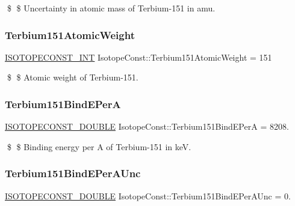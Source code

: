 \$ \$ Uncertainty in atomic mass of Terbium-\/151 in amu. \mbox{\label{group___isotope_const-_terbium-_tb151_ga727c99bcece1ee69cb6056fc2434ac6f}} 
\subsubsection{\texorpdfstring{Terbium151\+Atomic\+Weight}{Terbium151AtomicWeight}}
{\footnotesize\ttfamily \mbox{\hyperlink{group___isotope_const-_macros_ga5f18360b3e99483a35c32d789e62621c}{I\+S\+O\+T\+O\+P\+E\+C\+O\+N\+S\+T\+\_\+\+I\+NT}} Isotope\+Const\+::\+Terbium151\+Atomic\+Weight = 151}

\$ \$ Atomic weight of Terbium-\/151. \mbox{\label{group___isotope_const-_terbium-_tb151_ga8273639685e5c1fe7154f1833147f99f}} 
\subsubsection{\texorpdfstring{Terbium151\+Bind\+E\+PerA}{Terbium151BindEPerA}}
{\footnotesize\ttfamily \mbox{\hyperlink{group___isotope_const-_macros_ga8f45a7272ce02c0b4c65c44636ed719a}{I\+S\+O\+T\+O\+P\+E\+C\+O\+N\+S\+T\+\_\+\+D\+O\+U\+B\+LE}} Isotope\+Const\+::\+Terbium151\+Bind\+E\+PerA = 8208.}

\$ \$ Binding energy per A of Terbium-\/151 in keV. \mbox{\label{group___isotope_const-_terbium-_tb151_ga7e7e8564f1b29a7bf218d77202f49897}} 
\subsubsection{\texorpdfstring{Terbium151\+Bind\+E\+Per\+A\+Unc}{Terbium151BindEPerAUnc}}
{\footnotesize\ttfamily \mbox{\hyperlink{group___isotope_const-_macros_ga8f45a7272ce02c0b4c65c44636ed719a}{I\+S\+O\+T\+O\+P\+E\+C\+O\+N\+S\+T\+\_\+\+D\+O\+U\+B\+LE}} Isotope\+Const\+::\+Terbium151\+Bind\+E\+Per\+A\+Unc = 0.}

